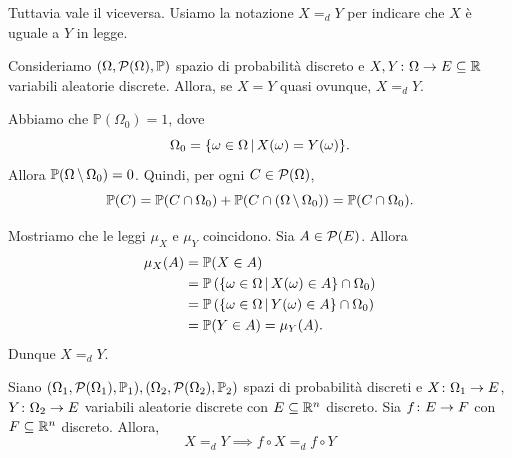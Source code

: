 \documentclass[a4paper]{article}
\begin{document}
Tuttavia vale il viceversa.
Usiamo la notazione \(X =_d Y\)
per indicare che \(X\) è uguale a \(Y\) in legge.

\begin{snippetproposition}{}
    Consideriamo \((\Omega, \mathcal P(\Omega), \mathbb P)\)
    spazio di probabilità discreto e \(X, Y \colon \Omega \to E \subseteq \mathbb{R}\)
    variabili aleatorie discrete.
    Allora, se \(X = Y\) quasi ovunque, \(X =_d Y\).
\end{snippetproposition}

\begin{snippetproof}{}
    Abbiamo che \(\mathbb P(\Omega_0)=1\), dove
    \[
        \Omega_0 = \{
            \omega \in \Omega
            \,|\,
            X(\omega) = Y(\omega)
        \}.
    \]
    Allora \(\mathbb P(\Omega \,\backslash\, \Omega_0)=0\).
    Quindi, per ogni \(C \in \mathcal P(\Omega)\),
    \[
        \mathbb P(C)
        =
        \mathbb P(C \cap \Omega_0)
        +
        \mathbb P(C \cap (\Omega \,\backslash\, \Omega_0))
        =
        \mathbb P(C \cap \Omega_0).
    \]

    Mostriamo che le leggi \(\mu_X\) e \(\mu_Y\) coincidono.
    Sia \(A \in \mathcal P(E)\). Allora
    \begin{align*}
        \mu_X(A)
        &= \mathbb P(X \in A) \\
        &= \mathbb P\left(
            \{\omega \in \Omega \,|\, X(\omega) \in A\}
            \cap \Omega_0
        \right) \\
        &= \mathbb P\left(
            \{\omega \in \Omega \,|\, Y(\omega) \in A\}
            \cap \Omega_0
        \right) \\
        &= \mathbb P(Y \in A)
        = \mu_Y(A).
    \end{align*}
    Dunque \(X =_d Y\).
\end{snippetproof}

\begin{snippetproposition}{}
    Siano \((\Omega_1, \mathcal P(\Omega_1), \mathbb P_1), (\Omega_2, \mathcal P(\Omega_2), \mathbb P_2)\)
    spazi di probabilità discreti e \(X \colon \Omega_1 \to E\),
    \(Y \colon \Omega_2 \to E\) variabili aleatorie discrete con \(E \subseteq \mathbb{R}^n\)
    discreto.
    Sia \(f \colon E \to F\)
    con \(F \subseteq \mathbb{R}^n\) discreto.
    Allora,
    \[
        X =_d Y \implies
        f \circ X =_d f \circ Y
    \]
\end{snippetproposition}
\end{document}
